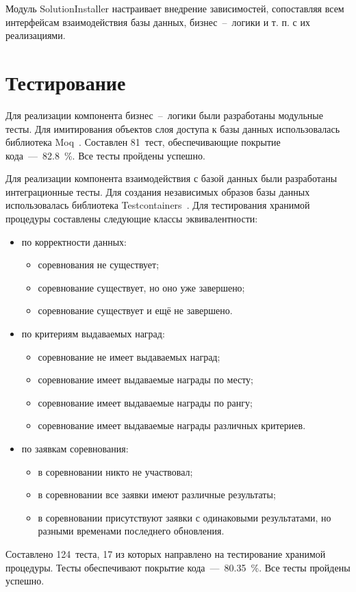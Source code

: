 Модуль SolutionInstaller настраивает внедрение зависимостей, сопоставляя всем интерфейсам взаимодействия базы данных, бизнес~--~логики и т. п. с их реализациями.

\section{Тестирование}

Для реализации компонента бизнес~--~логики были разработаны модульные тесты. Для имитирования объектов слоя доступа к базы данных использовалась библиотека Moq~\cite{moq}. Составлен 81~тест, обеспечивающие покрытие кода~---~82.8~\%. Все тесты пройдены успешно.

Для реализации компонента взаимодействия с базой данных были разработаны интеграционные тесты. Для создания независимых образов базы данных использовалась библиотека Testcontainers~\cite{testcontainers}. 
Для тестирования хранимой процедуры составлены следующие классы эквивалентности:
\begin{itemize}
	\item по корректности данных:
	\begin{itemize}
		\item соревнования не существует;
		\item соревнование существует, но оно уже завершено;
		\item соревнование существует и ещё не завершено.
	\end{itemize}
	\item по критериям выдаваемых наград:
	\begin{itemize}
		\item соревнование не имеет выдаваемых наград;
		\item соревнование имеет выдаваемые награды по месту;
		\item соревнование имеет выдаваемые награды по рангу;
		\item соревнование имеет выдаваемые награды различных критериев.
	\end{itemize}
	\item по заявкам соревнования:
	\begin{itemize}
		\item в соревновании никто не участвовал;
		\item в соревновании все заявки имеют различные результаты;
		\item в соревновании присутствуют заявки с одинаковыми результатами, но разными временами последнего обновления.
	\end{itemize}
\end{itemize}
Составлено 124~теста, 17 из которых направлено на тестирование хранимой процедуры. Тесты обеспечивают покрытие кода~---~80.35~\%. Все тесты пройдены успешно.

